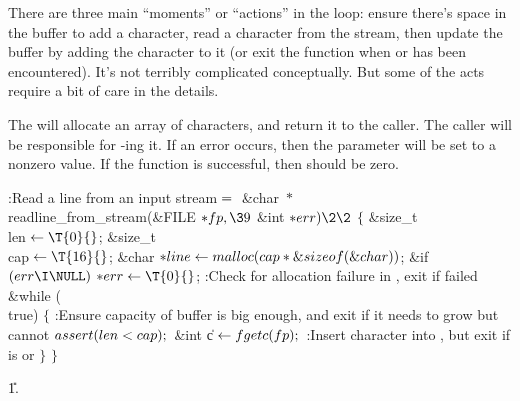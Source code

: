 There are three main ``moments'' or ``actions'' in the
loop: ensure there's space in the buffer to add a character, read a
character from the stream, then update the buffer by adding the
character to it (or exit the function when  or  has
been
encountered). It's not terribly complicated conceptually. But some of
the acts require a bit of care in the details.

The  will allocate an array of characters, and
return it to the caller. The caller will be responsible for
-ing it. If an error occurs, then the  parameter
will be
set to a nonzero value. If the function is successful, then 
should be zero.



\Y\B\4:Read a line from an input stream\X${}={}$\6
\1\1\&{char} ${}{*}{}$\\{readline\_from\_stream}(\&{FILE} ${}{*}\\{fp},\39{}$%
\&{int} ${}{*}\\{err})\2\2{}$\6
${}\{{}$\1\6
\&{size\_t} \\{len}${}\K\T{0}{}$;\6
\&{size\_t} \\{cap}${}\K\T{16}{}$;\6
\&{char} ${}{*}\\{line}\leftarrow\\{malloc}(\\{cap}*\&{sizeof}(\&{char})){}$;\7
\&{if} ${}(\\{err}\I\NULL){}$\1\5
${}{*}\\{err}\K\T{0}{}$;\2\6
:Check for allocation failure in , exit if failed\X\6
\&{while} (\\{true})\5
${}\{{}$\1\6
:Ensure capacity of  buffer is big enough, and exit if it
needs to grow but cannot\X{}\6
${}\\{assert}(\\{len}<\\{cap});{}$\7
\&{int} \|c${}\leftarrow\\{fgetc}(\\{fp});{}$\7
:Insert character into , but exit if  is 
or \X\6
\4${}\}{}$\2\6
\4${}\}{}$\2\par
\U1.\fi


